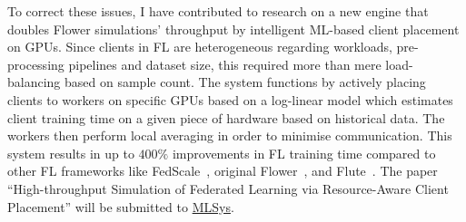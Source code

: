 To correct these issues, I have contributed to research on a new engine that doubles Flower simulations' throughput by intelligent ML-based client placement on GPUs. Since clients in FL are heterogeneous regarding workloads, pre-processing pipelines and dataset size, this required more than mere load-balancing based on sample count. The system functions by actively placing clients to workers on specific GPUs based on a log-linear model which estimates client training time on a given piece of hardware based on historical data. The workers then perform local averaging in order to minimise communication. This system results in up to $400\%$ improvements in FL training time compared to other FL frameworks like FedScale~\citep{FedScale}, original Flower~\citep{Flower}, and Flute~\citep{Flute}. The paper ``High-throughput Simulation of Federated Learning via Resource-Aware Client Placement'' will be submitted to \href{https://mlsys.org/}{MLSys}.

